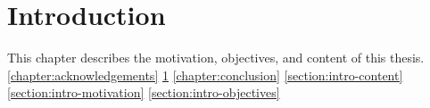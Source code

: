 % 
\chapter{Introduction}
\label{chapter:introduction}

\begin{ChapAbstract}
    This chapter describes the motivation, objectives, and content of this thesis.
    \ref{chapter:acknowledgements}
    \ref{chapter:introduction}
    \ref{chapter:conclusion}
    \ref{section:intro-content}
    \ref{section:intro-motivation}
    \ref{section:intro-objectives}
\end{ChapAbstract}




